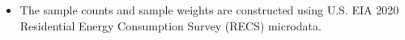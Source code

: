 \begin{itemize}
\item The sample counts and sample weights are constructed using U.S. EIA 2020 Residential Energy Consumption Survey (RECS) microdata.
\end{itemize}
